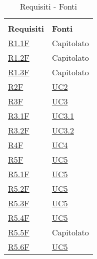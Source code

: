 
\begin{center}
    \centering
    \renewcommand{\arraystretch}{1.8}
    \label{tab:RequisitiFonti}
    \begin{longtable}[!h]{p{50px} p{50px}}
        \rowcolor{white}\caption{Requisiti - Fonti}                                  \\
        \rowcolor{logo!70} \textbf{Requisiti}        & \textbf{Fonti}                \\

        \hyperref[tab:RequisitiFunzionali]{R1.1F}    & Capitolato                    \\
        \hyperref[tab:RequisitiFunzionali]{R1.2F}    & Capitolato                    \\
        \hyperref[tab:RequisitiFunzionali]{R1.3F}    & Capitolato                    \\
        \hyperref[tab:RequisitiFunzionali]{R2F}      & \hyperref[sec:UC2]{UC2}       \\
        \hyperref[tab:RequisitiFunzionali]{R3F}      & \hyperref[sec:UC3]{UC3}       \\
        \hyperref[tab:RequisitiFunzionali]{R3.1F}    & \hyperref[sec:UC3.1]{UC3.1}   \\
        \hyperref[tab:RequisitiFunzionali]{R3.2F}    & \hyperref[sec:UC3.2]{UC3.2}   \\
        \hyperref[tab:RequisitiFunzionali]{R4F}      & \hyperref[sec:UC4]{UC4}       \\
        \hyperref[tab:RequisitiFunzionali]{R5F}      & \hyperref[sec:UC5]{UC5}       \\
        \hyperref[tab:RequisitiFunzionali]{R5.1F}    & \hyperref[sec:UC5]{UC5}       \\
        \hyperref[tab:RequisitiFunzionali]{R5.2F}    & \hyperref[sec:UC5]{UC5}       \\
        \hyperref[tab:RequisitiFunzionali]{R5.3F}    & \hyperref[sec:UC5]{UC5}       \\
        \hyperref[tab:RequisitiFunzionali]{R5.4F}    & \hyperref[sec:UC5]{UC5}       \\
        \hyperref[tab:RequisitiFunzionali]{R5.5F}    & Capitolato                    \\
        \hyperref[tab:RequisitiFunzionali]{R5.6F}    & \hyperref[sec:UC5]{UC5}       \\

\end{longtable}
\end{center}
